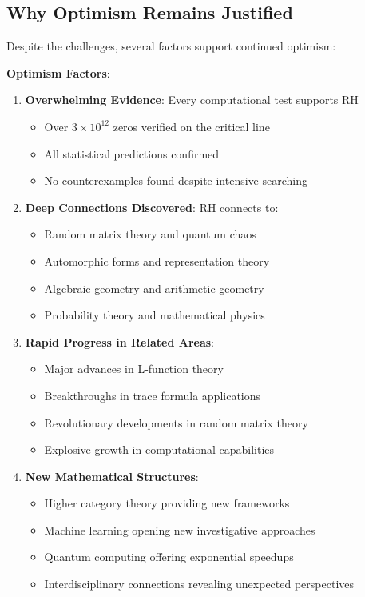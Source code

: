 \subsection{Why Optimism Remains Justified}
\label{subsec:justified_optimism}

Despite the challenges, several factors support continued optimism:

\noindent\textbf{Optimism Factors}:
\begin{enumerate}
\item \textbf{Overwhelming Evidence}: Every computational test supports RH
\begin{itemize}
\item Over $3 \times 10^{12}$ zeros verified on the critical line \cite{plattrigaux2020}
\item All statistical predictions confirmed
\item No counterexamples found despite intensive searching
\end{itemize}

\item \textbf{Deep Connections Discovered}: RH connects to:
\begin{itemize}
\item Random matrix theory and quantum chaos
\item Automorphic forms and representation theory
\item Algebraic geometry and arithmetic geometry
\item Probability theory and mathematical physics
\end{itemize}

\item \textbf{Rapid Progress in Related Areas}:
\begin{itemize}
\item Major advances in L-function theory
\item Breakthroughs in trace formula applications
\item Revolutionary developments in random matrix theory
\item Explosive growth in computational capabilities
\end{itemize}

\item \textbf{New Mathematical Structures}: 
\begin{itemize}
\item Higher category theory providing new frameworks
\item Machine learning opening new investigative approaches
\item Quantum computing offering exponential speedups
\item Interdisciplinary connections revealing unexpected perspectives
\end{itemize}
\end{enumerate}

